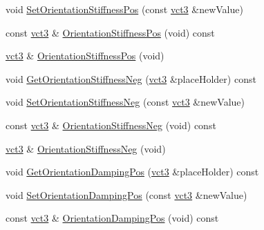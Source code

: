 \begin{DoxyCompactItemize}
void \hyperlink{classprm_fixture_gain_cartesian_set_a630b1d33fbe455656f085ad37d19f78b}{Set\-Orientation\-Stiffness\-Pos} (const \hyperlink{vct_fixed_size_vector_types_8h_a3af82acdbf4eeb73c551909240b106ea}{vct3} \&new\-Value)
\item 
const \hyperlink{vct_fixed_size_vector_types_8h_a3af82acdbf4eeb73c551909240b106ea}{vct3} \& \hyperlink{classprm_fixture_gain_cartesian_set_ad959355b4b9855f48febb049aca90443}{Orientation\-Stiffness\-Pos} (void) const 
\item 
\hyperlink{vct_fixed_size_vector_types_8h_a3af82acdbf4eeb73c551909240b106ea}{vct3} \& \hyperlink{classprm_fixture_gain_cartesian_set_ac5e6f2f8a689f091845fd1cfec263212}{Orientation\-Stiffness\-Pos} (void)
\item 
void \hyperlink{classprm_fixture_gain_cartesian_set_a3da217f1bd0996ab40b57cce396c6287}{Get\-Orientation\-Stiffness\-Neg} (\hyperlink{vct_fixed_size_vector_types_8h_a3af82acdbf4eeb73c551909240b106ea}{vct3} \&place\-Holder) const 
\item 
void \hyperlink{classprm_fixture_gain_cartesian_set_a730ab2096d29549d416ff35cd2e0e5e9}{Set\-Orientation\-Stiffness\-Neg} (const \hyperlink{vct_fixed_size_vector_types_8h_a3af82acdbf4eeb73c551909240b106ea}{vct3} \&new\-Value)
\item 
const \hyperlink{vct_fixed_size_vector_types_8h_a3af82acdbf4eeb73c551909240b106ea}{vct3} \& \hyperlink{classprm_fixture_gain_cartesian_set_ad64ec1fee6a61c839ba9468633eb1073}{Orientation\-Stiffness\-Neg} (void) const 
\item 
\hyperlink{vct_fixed_size_vector_types_8h_a3af82acdbf4eeb73c551909240b106ea}{vct3} \& \hyperlink{classprm_fixture_gain_cartesian_set_af7c2970eae2fd5c2162af6857e083f6d}{Orientation\-Stiffness\-Neg} (void)
\item 
void \hyperlink{classprm_fixture_gain_cartesian_set_ab2dd20be6f7c035f5f1cab7deb7e0e7d}{Get\-Orientation\-Damping\-Pos} (\hyperlink{vct_fixed_size_vector_types_8h_a3af82acdbf4eeb73c551909240b106ea}{vct3} \&place\-Holder) const 
\item 
void \hyperlink{classprm_fixture_gain_cartesian_set_aeab6a8418870cf538370c43e33eb9511}{Set\-Orientation\-Damping\-Pos} (const \hyperlink{vct_fixed_size_vector_types_8h_a3af82acdbf4eeb73c551909240b106ea}{vct3} \&new\-Value)
\item 
const \hyperlink{vct_fixed_size_vector_types_8h_a3af82acdbf4eeb73c551909240b106ea}{vct3} \& \hyperlink{classprm_fixture_gain_cartesian_set_a5f862c63126323d166cab7b97969e274}{Orientation\-Damping\-Pos} (void) const 

\end{DoxyCompactItemize}

